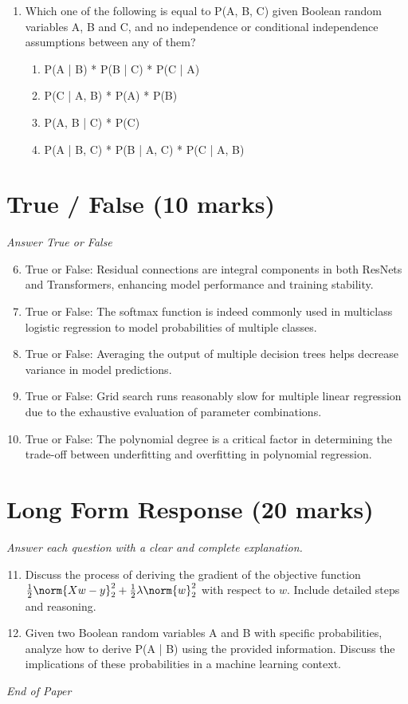 \documentclass[12pt]{article}
\begin{document}
\begin{enumerate}[label=\arabic*.]
\begin{enumerate}[label=(\alph*)]
\end{enumerate}
\item Which one of the following is equal to P(A, B, C) given Boolean random variables A, B and C, and no independence or conditional independence assumptions between any of them?
\begin{enumerate}[label=(\alph*)]
    \item P(A | B) * P(B | C) * P(C | A)
    \item P(C | A, B) * P(A) * P(B)
    \item P(A, B | C) * P(C)
    \item P(A | B, C) * P(B | A, C) * P(C | A, B)
\end{enumerate}
\end{enumerate}

\section*{True / False (10 marks)}
\textit{Answer True or False}
\begin{enumerate}[label=\arabic*.]
\setcounter{enumi}{5}
\item True or False: Residual connections are integral components in both ResNets and Transformers, enhancing model performance and training stability.
\item True or False: The softmax function is indeed commonly used in multiclass logistic regression to model probabilities of multiple classes.
\item True or False: Averaging the output of multiple decision trees helps decrease variance in model predictions.
\item True or False: Grid search runs reasonably slow for multiple linear regression due to the exhaustive evaluation of parameter combinations.
\item True or False: The polynomial degree is a critical factor in determining the trade-off between underfitting and overfitting in polynomial regression.
\end{enumerate}

\section*{Long Form Response (20 marks)}
\textit{Answer each question with a clear and complete explanation.}
\begin{enumerate}[label=\arabic*.]
\setcounter{enumi}{10}
\item Discuss the process of deriving the gradient of the objective function $\frac{1}{2} \norm{Xw-y}^2_2 + \frac{1}{2}\lambda \norm{w}^2_2$ with respect to $w$. Include detailed steps and reasoning.
\item Given two Boolean random variables A and B with specific probabilities, analyze how to derive P(A | B) using the provided information. Discuss the implications of these probabilities in a machine learning context.
\end{enumerate}

\vfill
\noindent\textit{End of Paper}
\end{document}
